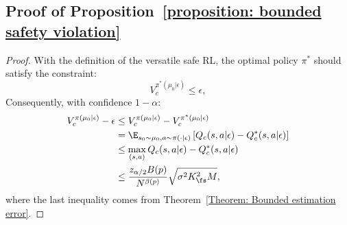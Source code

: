 

\subsection{Proof of Proposition~\ref{proposition: bounded safety violation}}
\label{proof: bounded safety violation}
\begin{proof}
With the definition of the versatile safe RL, the optimal policy $\pi^*$ should satisfy the constraint:
\begin{equation}
    V_c^{\pi^*(\mu_0|\epsilon)} \leq \epsilon,
\end{equation}
Consequently, with confidence $1-\alpha$:
\begin{equation}
\begin{aligned}
  V_c^{\pi(\mu_0|\epsilon)} - \epsilon & \leq V_c^{\pi(\mu_0|\epsilon)} - V_c^{\pi^*(\mu_0|\epsilon)} \\
  & = \E_{s_0 \sim \mu_0, a \sim \pi(\cdot | \epsilon)} \left[ Q_c(s, a|\epsilon) - Q_c^*(s, a|\epsilon) \right] \\
  & \leq \max_{(s, a)} Q_c(s, a|\epsilon) - Q_c^*(s, a|\epsilon) \\
  & \leq \frac{z_{\alpha/2} B(p)}{N^{\beta(p)}}  \sqrt{ \sigma^2 K_\fs^2 M },
\end{aligned}
\end{equation}
where the last inequality comes from Theorem~\ref{Theorem: Bounded estimation error}.
\end{proof}



